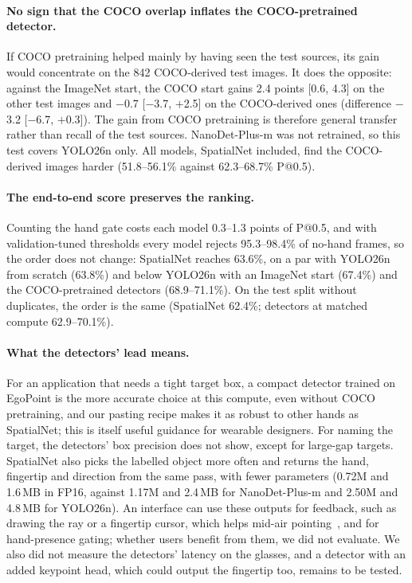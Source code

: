 \paragraph{No sign that the COCO overlap inflates the COCO-pretrained detector.} If COCO pretraining helped mainly by having seen the test sources, its gain would concentrate on the 842 COCO-derived test images. It does the opposite: against the ImageNet start, the COCO start gains 2.4 points [0.6, 4.3] on the other test images and $-$0.7 [$-$3.7, $+$2.5] on the COCO-derived ones (difference $-$3.2 [$-$6.7, $+$0.3]). The gain from COCO pretraining is therefore general transfer rather than recall of the test sources. NanoDet-Plus-m was not retrained, so this test covers YOLO26n only. All models, SpatialNet included, find the COCO-derived images harder (51.8--56.1\% against 62.3--68.7\% P@0.5).

\paragraph{The end-to-end score preserves the ranking.} Counting the hand gate costs each model 0.3--1.3 points of P@0.5, and with validation-tuned thresholds every model rejects 95.3--98.4\% of no-hand frames, so the order does not change: SpatialNet reaches 63.6\%, on a par with YOLO26n from scratch (63.8\%) and below YOLO26n with an ImageNet start (67.4\%) and the COCO-pretrained detectors (68.9--71.1\%). On the test split without duplicates, the order is the same (SpatialNet 62.4\%; detectors at matched compute 62.9--70.1\%).

\paragraph{What the detectors' lead means.} For an application that needs a tight target box, a compact detector trained on EgoPoint is the more accurate choice at this compute, even without COCO pretraining, and our pasting recipe makes it as robust to other hands as SpatialNet; this is itself useful guidance for wearable designers. For naming the target, the detectors' box precision does not show, except for large-gap targets. SpatialNet also picks the labelled object more often and returns the hand, fingertip and direction from the same pass, with fewer parameters (0.72M and 1.6\,MB in FP16, against 1.17M and 2.4\,MB for NanoDet-Plus-m and 2.50M and 4.8\,MB for YOLO26n). An interface can use these outputs for feedback, such as drawing the ray or a fingertip cursor, which helps mid-air pointing~\cite{mayer2018effect}, and for hand-presence gating; whether users benefit from them, we did not evaluate. We also did not measure the detectors' latency on the glasses, and a detector with an added keypoint head, which could output the fingertip too, remains to be tested.


